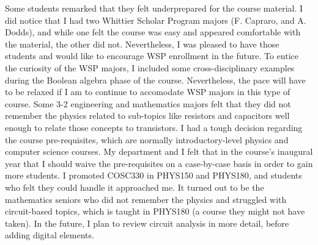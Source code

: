 \documentclass[../../main.tex]{subfiles}
\begin{document}
Some students remarked that they felt underprepared for the course material.  I did notice that I had two Whittier Scholar Program majors (F. Capraro, and A. Dodds), and while one felt the course was easy and appeared comfortable with the material, the other did not.  Nevertheless, I was pleased to have those students and would like to encourage WSP enrollment in the future.  To entice the curiosity of the WSP majors, I included some cross-disciplinary examples during the Boolean algebra phase of the course.  Nevertheless, the pace will have to be relaxed if I am to continue to accomodate WSP majors in this type of course.  Some 3-2 engineering and mathematics majors felt that they did not remember the physics related to sub-topics like resistors and capacitors well enough to relate those concepts to transistors.  I had a tough decision regarding the course pre-requisites, which are normally introductory-level physics and computer science courses.  My department and I felt that in the course's inaugural year that I should waive the pre-requisites on a case-by-case basis in order to gain more students.  I promoted COSC330 in PHYS150 and PHYS180, and students who felt they could handle it approached me. It turned out to be the mathematics seniors who did not remember the physics and struggled with circuit-based topics, which is taught in PHYS180 (a course they might not have taken).  In the future, I plan to review circuit analysis in more detail, before adding digital elements. \\ \hspace{0.1cm}

\end{document}
